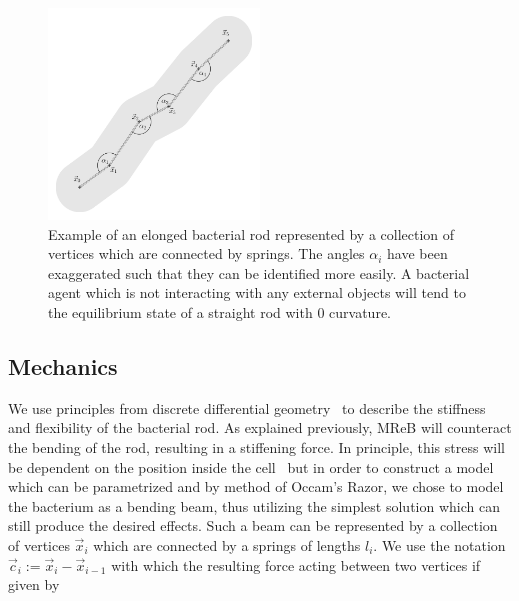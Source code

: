 \documentclass{article}
\begin{document}

\begin{figure}
    \centering
    \includegraphics[width=0.5\textwidth]{docs/source/_static/mechanics.png}
    \caption{
        Example of an elonged bacterial rod represented by a collection of vertices which are
        connected by springs.
        The angles $\alpha_i$ have been exaggerated such that they can be identified more easily.
        A bacterial agent which is not interacting with any external objects will tend to the
        equilibrium state of a straight rod with $0$ curvature.
    }
    \label{fig:mechanics-bacterium}
\end{figure}

\subsection{Mechanics}
\label{subsection:mechanical-model-mechanics}

We use principles from discrete differential geometry~\cite{bobenko2008discrete} to describe the
stiffness and flexibility of the bacterial rod.
As explained previously, MReB will counteract the bending of the rod, resulting in a stiffening
force.
In principle, this stress will be dependent on the position inside the cell~\cite{Chatterjee1988}
but in order to construct a model which can be parametrized and by method of Occam's Razor, we chose
to model the bacterium as a bending beam, thus utilizing the simplest solution which can still
produce the desired effects.
Such a beam can be represented by a collection of vertices $\vec{x}_i$ which are connected by a
springs of lengths $l_i$.
We use the notation $\vec{c}_i:=\vec{x}_i-\vec{x}_{i-1}$ with which the resulting force acting
between two vertices if given by
\end{document}
